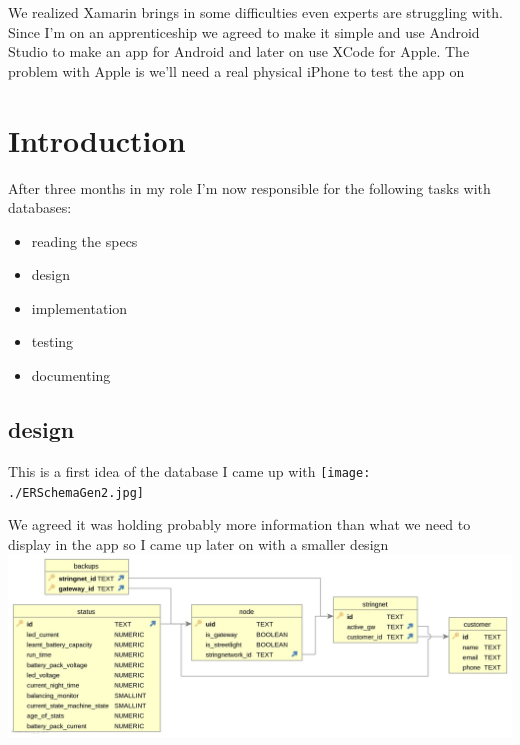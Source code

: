 \documentclass[a4paper,12pt]{article}
\begin{document}
We realized Xamarin brings in some difficulties even experts are struggling with. Since I'm on an apprenticeship we agreed to make it simple and use Android Studio to make an app for Android and later on use XCode for Apple. The problem with Apple is we'll need a real physical iPhone to test the app on

 

\section{Introduction}

After three months in my role I'm now responsible for the following tasks with databases:

\begin{itemize}
\item {reading the specs}
\item design
\item implementation
\item testing 
\item documenting
\end{itemize}

\subsection{design}
This is a first idea of the database I came up with
\texttt{[image: ./ERSchemaGen2.jpg]}

We agreed it was holding probably more information than what we need to display in the app so I came up later on with a smaller design
\includegraphics[width=15cm]{./SecondERSchemaGen2.jpg}

\printindex
\end{document}
